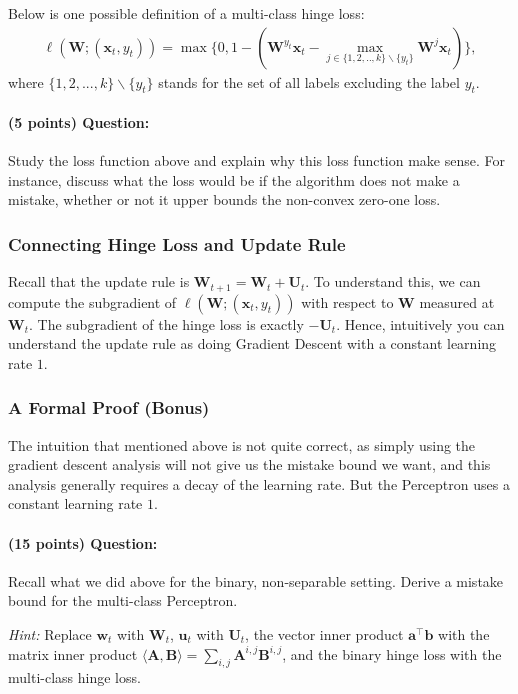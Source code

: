 \documentclass{article}
\begin{document}
Below is one possible definition of a multi-class hinge loss:
\begin{align}
    \ell(\mathbf{W}; (\mathbf{x}_t,y_t)) =\max\{0, 1 - (\mathbf{W}^{y_t} \mathbf{x}_t - \max_{j\in \{1,2,..,k\}\backslash\{y_t\}} \mathbf{W}^j \mathbf{x}_t)\},
\end{align}
where $\{1,2,...,k\}\backslash\{y_t\}$ stands for the set of all labels excluding the label $y_t$.

\paragraph{(5 points) Question:} Study the loss function above and explain why this loss function make sense. 
For instance, discuss what the loss would be if the algorithm does not make a mistake, whether or not it upper bounds the non-convex zero-one loss. 

\subsubsection{Connecting Hinge Loss and Update Rule}
Recall that the update rule is $\mathbf{W}_{t+1} = \mathbf{W}_t + \mathbf{U}_t$. To understand this, we can compute the subgradient of $\ell(\mathbf{W}; (\mathbf{x}_t, y_t))$ with respect to $\mathbf{W}$ measured at $\mathbf{W}_t$. 
The subgradient of the hinge loss is exactly $-\mathbf{U}_t$. Hence, intuitively you can understand the update rule as doing Gradient Descent with a constant learning rate $1$. 

\subsubsection{A Formal Proof (Bonus)}

The intuition that mentioned above is not quite correct, as simply using the gradient descent analysis will not give us the mistake bound we want, and this analysis generally requires a decay of the learning rate. But the Perceptron uses a constant learning rate $1$.  


\paragraph{(15 points) Question:} Recall what we did above for the binary, non-separable setting. Derive a mistake bound for the multi-class Perceptron. 

\noindent\textit{Hint:} Replace $\mathbf{w}_t$ with $\mathbf{W}_t$, $\mathbf{u}_t$ with $\mathbf{U}_t$, the vector inner product $\mathbf{a}^{\top}\mathbf{b}$ with the matrix inner product $\langle \mathbf{A}, \mathbf{B}\rangle = \sum_{i,j}\mathbf{A}^{i,j} \mathbf{B}^{i,j}$, and the binary hinge loss with the multi-class hinge loss. 
\end{document}
